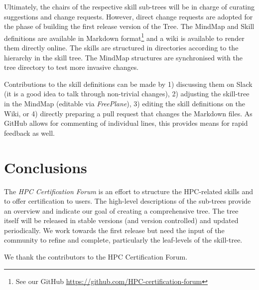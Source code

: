 \documentclass[jocse]{jocseart}
\begin{document}
Ultimately, the chairs of the respective skill sub-trees will be in charge of curating suggestions and change requests. However, direct change requests are adopted for the phase of building the first release version of the Tree.  
The MindMap and Skill definitions are available in Markdown format\footnote{See our GitHub \url{https://github.com/HPC-certification-forum}} and a wiki is available to render them directly online. 
The skills are structured in directories according to the hierarchy in the skill tree. 
The MindMap structures are synchronised with the tree directory to test more invasive changes. 

Contributions to the skill definitions can be made by 1) discussing them on Slack (it is a good idea to talk through non-trivial changes), 2) adjusting the skill-tree in the MindMap (editable via \textit{FreePlane}), 3) editing the skill definitions on the Wiki, or 4) directly preparing a pull request that changes the Markdown files.
As GitHub allows for commenting of individual lines, this provides means for rapid feedback as well.

\section{Conclusions}

The \textit{HPC Certification Forum} is an effort to structure the HPC-related skills and to offer certification to users.
The high-level descriptions of the sub-trees provide an overview and indicate our goal of creating a comprehensive tree.
The tree itself will be released in stable versions (and version controlled) and updated periodically.
We work towards the first release but need the input of the community to refine and complete, particularly the leaf-levels of the skill-tree. 


\begin{acks}
\small We thank the contributors to the HPC Certification Forum.
\end{acks}

%
%
\end{document}
